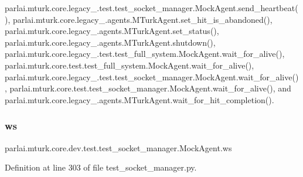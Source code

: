 parlai.\+mturk.\+core.\+legacy\+\_.\+test.\+test\+\_\+socket\+\_\+manager.\+Mock\+Agent.\+send\+\_\+heartbeat(), parlai.\+mturk.\+core.\+legacy\+\_.\+agents.\+M\+Turk\+Agent.\+set\+\_\+hit\+\_\+is\+\_\+abandoned(), parlai.\+mturk.\+core.\+legacy\+\_.\+agents.\+M\+Turk\+Agent.\+set\+\_\+status(), parlai.\+mturk.\+core.\+legacy\+\_.\+agents.\+M\+Turk\+Agent.\+shutdown(), parlai.\+mturk.\+core.\+legacy\+\_.\+test.\+test\+\_\+full\+\_\+system.\+Mock\+Agent.\+wait\+\_\+for\+\_\+alive(), parlai.\+mturk.\+core.\+test.\+test\+\_\+full\+\_\+system.\+Mock\+Agent.\+wait\+\_\+for\+\_\+alive(), parlai.\+mturk.\+core.\+legacy\+\_.\+test.\+test\+\_\+socket\+\_\+manager.\+Mock\+Agent.\+wait\+\_\+for\+\_\+alive(), parlai.\+mturk.\+core.\+test.\+test\+\_\+socket\+\_\+manager.\+Mock\+Agent.\+wait\+\_\+for\+\_\+alive(), and parlai.\+mturk.\+core.\+legacy\+\_.\+agents.\+M\+Turk\+Agent.\+wait\+\_\+for\+\_\+hit\+\_\+completion().

\mbox{\label{classparlai_1_1mturk_1_1core_1_1dev_1_1test_1_1test__socket__manager_1_1MockAgent_a4b3ec6c638cfe8095425ddab95a69cac}} 
\subsubsection{\texorpdfstring{ws}{ws}}
{\footnotesize\ttfamily parlai.\+mturk.\+core.\+dev.\+test.\+test\+\_\+socket\+\_\+manager.\+Mock\+Agent.\+ws}



Definition at line 303 of file test\+\_\+socket\+\_\+manager.\+py.



